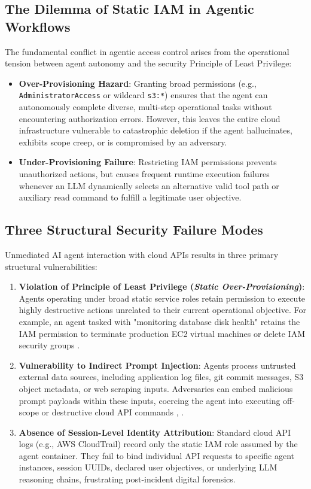 \documentclass[conference]{IEEEtran}
\begin{document}
\subsection{The Dilemma of Static IAM in Agentic Workflows}
The fundamental conflict in agentic access control arises from the operational tension between agent autonomy and the security Principle of Least Privilege:
\begin{itemize}
    \item \textbf{Over-Provisioning Hazard}: Granting broad permissions (e.g., \texttt{AdministratorAccess} or wildcard \texttt{s3:*}) ensures that the agent can autonomously complete diverse, multi-step operational tasks without encountering authorization errors. However, this leaves the entire cloud infrastructure vulnerable to catastrophic deletion if the agent hallucinates, exhibits scope creep, or is compromised by an adversary.
    \item \textbf{Under-Provisioning Failure}: Restricting IAM permissions prevents unauthorized actions, but causes frequent runtime execution failures whenever an LLM dynamically selects an alternative valid tool path or auxiliary read command to fulfill a legitimate user objective.
\end{itemize}

\subsection{Three Structural Security Failure Modes}
Unmediated AI agent interaction with cloud APIs results in three primary structural vulnerabilities:
\begin{enumerate}
    \item \textbf{Violation of Principle of Least Privilege (\textit{Static Over-Provisioning})}: Agents operating under broad static service roles retain permission to execute highly destructive actions unrelated to their current operational objective. For example, an agent tasked with "monitoring database disk health" retains the IAM permission to terminate production EC2 virtual machines or delete IAM security groups \cite{perez2023}.
    \item \textbf{Vulnerability to Indirect Prompt Injection}: Agents process untrusted external data sources, including application log files, git commit messages, S3 object metadata, or web scraping inputs. Adversaries can embed malicious prompt payloads within these inputs, coercing the agent into executing off-scope or destructive cloud API commands \cite{perez2023}, \cite{shavit2023}.
    \item \textbf{Absence of Session-Level Identity Attribution}: Standard cloud API logs (e.g., AWS CloudTrail) record only the static IAM role assumed by the agent container. They fail to bind individual API requests to specific agent instances, session UUIDs, declared user objectives, or underlying LLM reasoning chains, frustrating post-incident digital forensics.
\end{enumerate}
\end{document}
